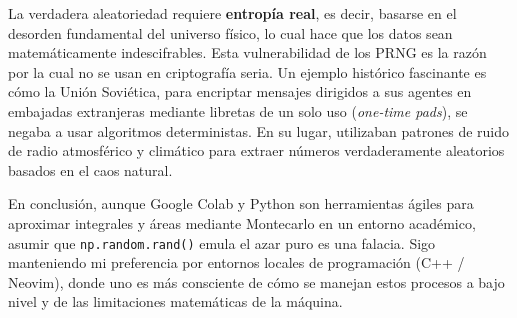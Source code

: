 \documentclass[11pt]{article}
\begin{document}
La verdadera aleatoriedad requiere \textbf{entropía real}, es decir, basarse en el desorden fundamental del universo físico, lo cual hace que los datos sean matemáticamente indescifrables. Esta vulnerabilidad de los PRNG es la razón por la cual no se usan en criptografía seria. Un ejemplo histórico fascinante es cómo la Unión Soviética, para encriptar mensajes dirigidos a sus agentes en embajadas extranjeras mediante libretas de un solo uso (\textit{one-time pads}), se negaba a usar algoritmos deterministas. En su lugar, utilizaban patrones de ruido de radio atmosférico y climático para extraer números verdaderamente aleatorios basados en el caos natural.

En conclusión, aunque Google Colab y Python son herramientas ágiles para aproximar integrales y áreas mediante Montecarlo en un entorno académico, asumir que \texttt{np.random.rand()} emula el azar puro es una falacia. Sigo manteniendo mi preferencia por entornos locales de programación (C++ / Neovim), donde uno es más consciente de cómo se manejan estos procesos a bajo nivel y de las limitaciones matemáticas de la máquina.
\end{document}
